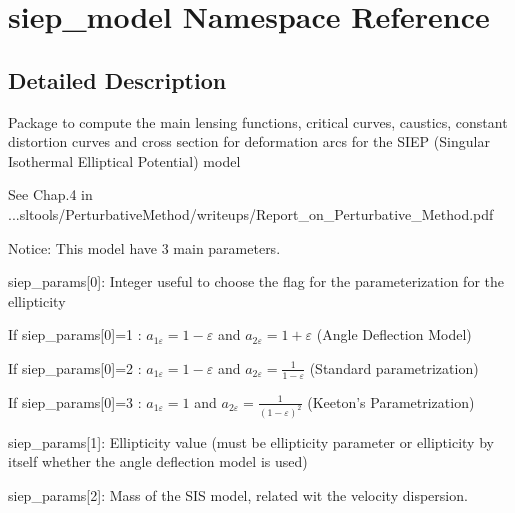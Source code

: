 \hypertarget{namespacesiep__model}{
\section{siep\_\-model Namespace Reference}
\label{namespacesiep__model}
}


\subsection{Detailed Description}
Package to compute the main lensing functions, critical curves, caustics, constant distortion curves and cross section for deformation arcs for the SIEP (Singular Isothermal Elliptical Potential) model

See Chap.4 in ...sltools/PerturbativeMethod/writeups/Report\_\-on\_\-Perturbative\_\-Method.pdf

Notice: This model have 3 main parameters.

siep\_\-params\mbox{[}0\mbox{]}: Integer useful to choose the flag for the parameterization for the ellipticity

If siep\_\-params\mbox{[}0\mbox{]}=1 : $ a_{1\varepsilon}=1-\varepsilon $ and $ a_{2\varepsilon}=1+\varepsilon $ (Angle Deflection Model)

If siep\_\-params\mbox{[}0\mbox{]}=2 : $ a_{1\varepsilon}=1-\varepsilon $ and $ a_{2\varepsilon}=\frac{1}{1-\varepsilon} $ (Standard parametrization)

If siep\_\-params\mbox{[}0\mbox{]}=3 : $ a_{1\varepsilon}=1 $ and $ a_{2\varepsilon}=\frac{1}{(1-\varepsilon)^2} $ (Keeton's Parametrization)

siep\_\-params\mbox{[}1\mbox{]}: Ellipticity value (must be ellipticity parameter or ellipticity by itself whether the angle deflection model is used)

siep\_\-params\mbox{[}2\mbox{]}: Mass of the SIS model, related wit the velocity dispersion. 